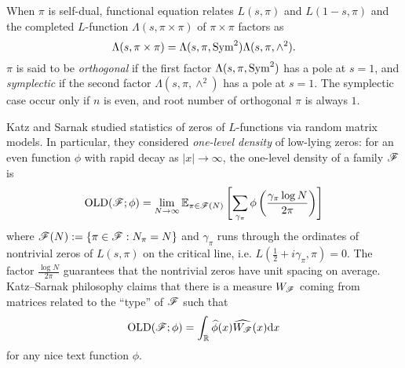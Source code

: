 When $\pi$ is self-dual, functional equation relates $L(s, \pi)$ and $L(1-s, \pi)$ and the completed $L$-function $\Lambda(s, \pi \times \pi)$ of $\pi \times \pi$ factors as
\[
\Lambda(s, \pi \times \pi) = \Lambda(s, \pi, \mathrm{Sym}^2) \Lambda(s, \pi, \wedge^2).
\]
$\pi$ is said to be \emph{orthogonal} if the first factor $\Lambda(s, \pi, \mathrm{Sym}^2)$ has a pole at $s = 1$, and \emph{symplectic} if the second factor $\Lambda(s, \pi, \wedge^2)$ has a pole at $s = 1$.
The symplectic case occur only if $n$ is even, and root number of orthogonal $\pi$ is always $1$.

Katz and Sarnak \cite{katz1999zeroes,katz2023random} studied statistics of zeros of $L$-functions via random matrix models.
In particular, they considered \emph{one-level density} of low-lying zeros: for an even function $\phi$ with rapid decay as $|x| \to \infty$, the one-level density of a family $\mathscr{F}$ is
\begin{equation}
    \mathrm{OLD}(\mathscr{F}; \phi) = \lim_{N \to \infty} \mathbb{E}_{\pi \in \mathscr{F}(N)} \left[\sum_{\gamma_\pi} \phi\left(\frac{\gamma_\pi \log N}{2 \pi}\right)\right]
\end{equation}
where $\mathscr{F}(N) := \{\pi \in \mathscr{F}: N_\pi = N\}$ and $\gamma_\pi$ runs through the ordinates of nontrivial zeros of $L(s, \pi)$ on the critical line, i.e. $L\left(\frac{1}{2} + i\gamma_\pi, \pi\right) = 0$.
The factor $\frac{\log N}{2\pi}$ guarantees that the nontrivial zeros have unit spacing on average.
Katz--Sarnak philosophy claims that there is a measure $W_{\mathscr{F}}$ coming from matrices related to the ``type'' of $\mathscr{F}$ such that
\begin{equation}
    \mathrm{OLD}(\mathscr{F}; \phi) = \int_{\mathbb{R}} \widehat{\phi}(x) \widehat{W_{\mathscr{F}}}(x) \mathrm{d} x
\end{equation}
for any nice text function $\phi$.

